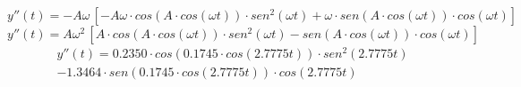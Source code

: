 \documentclass[letter,11pt]{article}
\begin{document}
\begin{equation*}
    y''(t) = - A \omega\, [ -A \omega \cdot cos(A \cdot cos(\omega t)) \cdot sen^2(\omega t) + \omega \cdot sen(A \cdot cos(\omega t)) \cdot cos(\omega t)]
\end{equation*}
\begin{equation*}
    y''(t) = A \omega^2\, [A \cdot cos(A \cdot cos(\omega t)) \cdot sen^2(\omega t) - sen(A \cdot cos(\omega t)) \cdot cos(\omega t)]
\end{equation*}
\begin{equation}
    \begin{split}
        y''(t) = 0.2350 \cdot cos(0.1745 \cdot cos(2.7775 t)) \cdot sen^2(2.7775 t) \\
                 -1.3464 \cdot sen(0.1745 \cdot cos(2.7775t)) \cdot cos(2.7775t)
    \end{split}
\end{equation}
\end{document}
